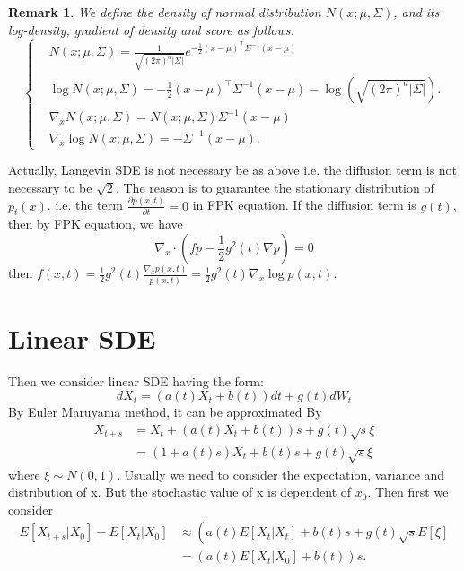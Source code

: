 \documentclass{ctexart}
\newtheorem{remark}{Remark}
\begin{document}
\begin{remark}
    We define the density of normal distribution $N(x ; \mu, \Sigma)$, and its log-density, gradient of density and score as follows:
    \begin{equation}\left\{
        \begin{aligned}
            &N(x ; \mu, \Sigma)=\frac{1}{\sqrt{(2 \pi)^{d}|\Sigma|}} e^{-\frac{1}{2}(x-\mu)^{\top} \Sigma^{-1}(x-\mu)}\\
            &\log N(x ; \mu, \Sigma)=-\frac{1}{2}(x-\mu)^{\top} \Sigma^{-1}(x-\mu)-\log \left(\sqrt{(2 \pi)^{d}|\Sigma|}\right) . \\
            &\nabla_{x} N(x ; \mu, \Sigma)=N(x ; \mu, \Sigma)\Sigma^{-1}(x-\mu) \\
            &\nabla_{x} \log N(x ; \mu, \Sigma)=-\Sigma^{-1}(x-\mu) .
        \end{aligned}\right.
    \end{equation}
\end{remark}

Actually, Langevin SDE is not necessary be as above i.e. the diffusion term is not necessary to be $\sqrt{2}$. The reason is to guarantee the stationary distribution of $p_t(x)$.
i.e. the term $\frac{\partial p(x,t)}{\partial t}=0$ in FPK equation. If the diffusion term is $g(t)$, then by FPK equation, we have 
$$\nabla_x\cdot(fp-\frac{1}{2}g^2(t)\nabla p)=0$$
then $f(x,t) = \frac{1}{2}g^2(t)\frac{\nabla_x p(x, t)}{p(x,t)}=\frac{1}{2}g^2(t)\nabla_x\log p(x, t)$.

\section{Linear SDE}
Then we consider linear SDE having the form:
\begin{equation}
    dX_t = (a(t)X_t + b(t))dt + g(t)dW_t
\end{equation}
By Euler Maruyama method, it can be approximated By
\begin{equation}
    \begin{aligned}
        X_{t+s}&=X_t + (a(t)X_t + b(t))s+g(t)\sqrt{s}\xi\\
        &=(1+a(t)s)X_t + b(t)s + g(t)\sqrt{s}\xi
    \end{aligned}
\end{equation}
where $\xi\sim N(0, 1)$. Usually we need to consider the expectation, variance and distribution of  x. But the stochastic value of x is dependent of $x_0$. Then first we consider
\begin{equation}
    \begin{aligned}
    E\left[X_{t+s} | X_{0}\right]-E\left[X_{t} | X_{0}\right] & \approx\left(a(t) E\left[X_{t} | X_{t}\right]+b(t) s+g(t) \sqrt{s} E[\xi]\right. \\
    & =\left(a(t) E\left[X_{t} | X_{0}\right]+b(t)\right) s .
    \end{aligned}
\end{equation}
\end{document}
